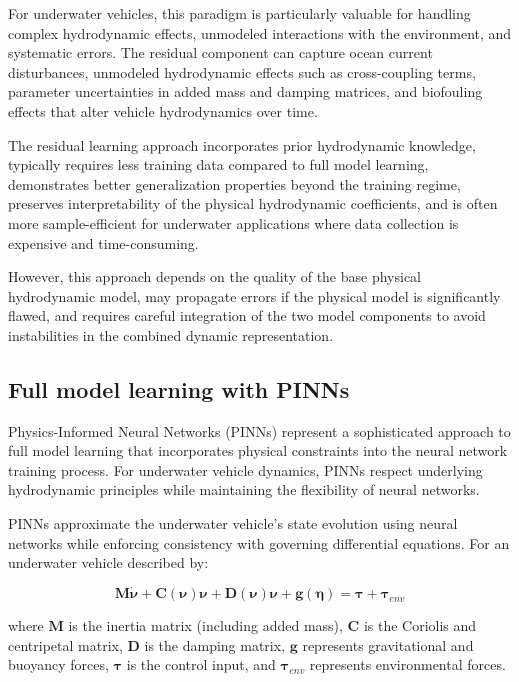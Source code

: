 For underwater vehicles, this paradigm is particularly valuable for handling complex hydrodynamic effects, unmodeled interactions with the environment, and systematic errors. The residual component can capture ocean current disturbances, unmodeled hydrodynamic effects such as cross-coupling terms, parameter uncertainties in added mass and damping matrices, and biofouling effects that alter vehicle hydrodynamics over time.

The residual learning approach incorporates prior hydrodynamic knowledge, typically requires less training data compared to full model learning, demonstrates better generalization properties beyond the training regime, preserves interpretability of the physical hydrodynamic coefficients, and is often more sample-efficient for underwater applications where data collection is expensive and time-consuming.

However, this approach depends on the quality of the base physical hydrodynamic model, may propagate errors if the physical model is significantly flawed, and requires careful integration of the two model components to avoid instabilities in the combined dynamic representation.

\subsection{Full model learning with PINNs}
Physics-Informed Neural Networks (PINNs) represent a sophisticated approach to full model learning that incorporates physical constraints into the neural network training process. For underwater vehicle dynamics, PINNs respect underlying hydrodynamic principles while maintaining the flexibility of neural networks.

PINNs approximate the underwater vehicle's state evolution using neural networks while enforcing consistency with governing differential equations. For an underwater vehicle described by:

\begin{equation}
\mathbf{M}\dot{\mathbf{\nu}} + \mathbf{C}(\mathbf{\nu})\mathbf{\nu} + \mathbf{D}(\mathbf{\nu})\mathbf{\nu} + \mathbf{g}(\mathbf{\eta}) = \mathbf{\tau} + \mathbf{\tau}_{env}
\end{equation}

where $\mathbf{M}$ is the inertia matrix (including added mass), $\mathbf{C}$ is the Coriolis and centripetal matrix, $\mathbf{D}$ is the damping matrix, $\mathbf{g}$ represents gravitational and buoyancy forces, $\mathbf{\tau}$ is the control input, and $\mathbf{\tau}_{env}$ represents environmental forces.


